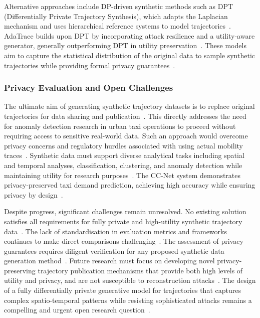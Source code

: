 \documentclass[runningheads]{llncs}
\begin{document}
Alternative approaches include DP-driven synthetic methods such as DPT (Differentially Private Trajectory Synthesis), which adapts the Laplacian mechanism and uses hierarchical reference systems to model trajectories~\cite{Chen2011DPTP,Jin2023SurveyExpStudy}. AdaTrace builds upon DPT by incorporating attack resilience and a utility-aware generator, generally outperforming DPT in utility preservation~\cite{Jin2023SurveyExpStudy}. These models aim to capture the statistical distribution of the original data to sample synthetic trajectories while providing formal privacy guarantees~\cite{Jin2023SurveyExpStudy,Qu2020GANs5G}.

\subsubsection{Privacy Evaluation and Open Challenges}

The ultimate aim of generating synthetic trajectory datasets is to replace original trajectories for data sharing and publication~\cite{Buchholz2024SoK,Rao2021LSTMTrajGAN,Liu2018TrajGANs}. This directly addresses the need for anomaly detection research in urban taxi operations to proceed without requiring access to sensitive real-world data. Such an approach would overcome privacy concerns and regulatory hurdles associated with using actual mobility traces~\cite{Buchholz2024SoK,Rao2021LSTMTrajGAN,Liu2018TrajGANs}. Synthetic data must support diverse analytical tasks including spatial and temporal analyses, classification, clustering, and anomaly detection while maintaining utility for research purposes~\cite{Rao2021LSTMTrajGAN,Chen2011DPTP}. The CC-Net system demonstrates privacy-preserved taxi demand prediction, achieving high accuracy while ensuring privacy by design~\cite{Ozeki2023PPTP}.

Despite progress, significant challenges remain unresolved. No existing solution satisfies all requirements for fully private and high-utility synthetic trajectory data~\cite{Buchholz2024SoK}. The lack of standardisation in evaluation metrics and frameworks continues to make direct comparisons challenging~\cite{Primault2019LongRoad,Jin2023SurveyExpStudy}. The assessment of privacy guarantees requires diligent verification for any proposed synthetic data generation method~\cite{Buchholz2024SoK}. Future research must focus on developing novel privacy-preserving trajectory publication mechanisms that provide both high levels of utility and privacy, and are not susceptible to reconstruction attacks~\cite{Buchholz2022RAoPT,Buchholz2024SoK,Primault2019LongRoad}. The design of a fully differentially private generative model for trajectories that captures complex spatio-temporal patterns while resisting sophisticated attacks remains a compelling and urgent open research question~\cite{Buchholz2024SoK,Buchholz2022RAoPT}.
\end{document}

